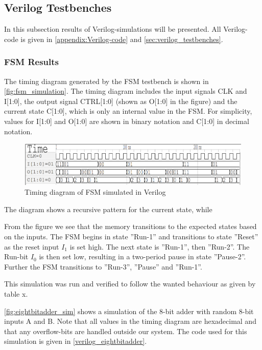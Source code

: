 \subsection{Verilog Testbenches}

In this subsection results of Verilog-simulations will be presented. All Verilog-code is given in \autoref{appendix:Verilog-code} and \ref{sec:verilog_testbenches}.

\subsubsection{FSM Results}
\label{subsubsec:fsm_results}

\noindent
The timing diagram generated by the FSM testbench is shown in \autoref{fig:fsm_simulation}. The timing diagram includes the input signals CLK and I[1:0], the output signal CTRL[1:0] (shown as O[1:0] in the figure) and the current state C[1:0], which is only an internal value in the FSM. For simplicity, values for I[1:0] and O[1:0] are shown in binary notation and C[1:0] in decimal notation.

\begin{figure}[H]
    \centering
    \includegraphics[width=\textwidth]{Figures/FSM_testbench_out.png}
    \caption{Timing diagram of FSM simulated in Verilog}
    \label{fig:fsm_simulation}
\end{figure}

The diagram shows a recursive pattern for the current state, while 



From the figure we see that the memory transitions to the expected states based on the inputs. The FSM begins in state ''Run-1'' and transitions to state ''Reset'' as the reset input $I_1$ is set high. The next state is ''Run-1'', then ''Run-2''. The Run-bit $I_0$ is then set low, resulting in a two-period pause in state ''Pause-2''. Further the FSM transitions to ''Run-3'', ''Pause'' and ''Run-1''.

This simulation was run and verified to follow the wanted behaviour as given by table x.

\autoref{fig:eightbitadder_sim} shows a simulation of the 8-bit adder with random 8-bit inputs A and B. Note that all values in the timing diagram are hexadecimal and that any overflow-bits are handled outside our system. The code used for this simulation is given in \autoref{verilog_eightbitadder}.

